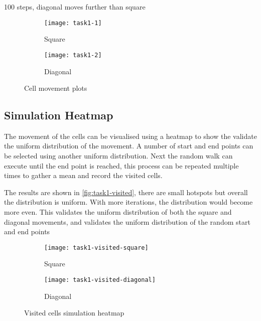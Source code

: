 100 steps, diagonal moves further than square

\begin{figure}[ht]
    \centering
    \begin{subfigure}{0.45\textwidth}
    	\texttt{[image: task1-1]}
    	\caption[Square]{Square}
    	\label{fig:task1-1}
    \end{subfigure}
    \begin{subfigure}{0.45\textwidth}
    	\texttt{[image: task1-2]}
    	\caption[Diagonal]{Diagonal}
    	\label{fig:task1-2}
	\end{subfigure}
	\caption[Cell movement plots]{Cell movement plots}
    \label{fig:task1}
\end{figure}

\clearpage

\subsection{Simulation Heatmap}

The movement of the cells can be visualised using a heatmap to show the validate the uniform distribution of the movement.
A number of start and end points can be selected using another uniform distribution.
Next the random walk can execute until the end point is reached, this process can be repeated multiple times to gather a mean and record the visited cells.


The results are shown in \autoref{fig:task1-visited}, there are small hotspots but overall the distribution is uniform.
With more iterations, the distribution would become more even.
This validates the uniform distribution of both the square and diagonal movements,
and validates the uniform distribution of the random start and end points

\begin{figure}[ht]
    \centering
    \begin{subfigure}{0.45\textwidth}
        \texttt{[image: task1-visited-square]}
        \caption[Square]{Square}
        \label{fig:task1-visited-square}
    \end{subfigure}
    \begin{subfigure}{0.45\textwidth}
        \texttt{[image: task1-visited-diagonal]}
        \caption[Diagonal]{Diagonal}
        \label{fig:task1-visited-diagonal}
    \end{subfigure}
    \caption[Visited cells simulation heatmap]{Visited cells simulation heatmap}
    \label{fig:task1-visited}
\end{figure}


